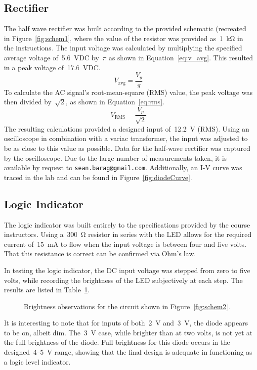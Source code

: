\subsection{Rectifier}
The half wave rectifier was built according to the provided schematic (recreated
in Figure~\ref{fig:schem1}, where the value of the resistor was provided
as~\SI{1}{\kilo\ohm} in the instructions.  The input voltage was calculated by
multiplying the specified average voltage of~\SI{5.6}{\volt}DC by~$\pi$ as
shown in Equation~\ref{eq:v_avg}.  This resulted in a peak voltage
of~\SI{17.6}{\volt}DC.
%
\begin{equation}
	V_\text{avg} = \frac{V_p}{\pi}
	\label{eq:v_avg}
\end{equation}
%
To calculate the AC signal's root-mean-square (RMS) value, the peak voltage was
then divided by~$\sqrt{2}$, as shown in Equation~\ref{eq:rms}.
%
\begin{equation}
	V_\text{RMS} = \frac{V_p}{\sqrt{2}}
	\label{eq:rms}
\end{equation}
%
The resulting calculations provided a designed input of~\SI{12.2}{\volt} (RMS).
Using an oscilloscope in combination with a variac transformer, the input was
adjusted to be as close to this value as possible. Data for the half-wave
rectifier was captured by the oscilloscope.  Due to the large number of
measurements taken, it is available by request to
\texttt{sean.barag@gmail.com}.  Additionally, an I-V curve was traced in the
lab and can be found in Figure~\ref{fig:diodeCurve}.

\subsection{Logic Indicator}
The logic indicator was built entirely to the specifications provided by the
course instructors.  Using a~\SI{300}{\ohm} resistor in series with the LED
allows for the required current of~\SI{15}{\milli\ampere} to flow when the
input voltage is between four and five volts.  That this resistance is correct
can be confirmed via Ohm's law.

In testing the logic indicator, the DC input voltage was stepped from zero to
five volts, while recording the brightness of the LED subjectively at each
step.  The results are listed in Table~\ref{tab:ckt2data}.
%
\begin{figure}[H]
	\centering
	
	\caption{Brightness observations for the circuit shown in
		Figure~\ref{fig:schem2}.}
	\label{tab:ckt2data}
\end{figure}
%
It is interesting to note that for inputs of both~\SI{2}{\volt}
and~\SI{3}{\volt}, the diode appears to be on, albeit dim.  The~\SI{3}{\volt}
case, while brighter than at two volts, is not yet at the full brightness of
the diode.  Full brightness for this diode occurs in the
designed~4--\SI{5}{\volt} range, showing that the final design is adequate in
functioning as a logic level indicator.

